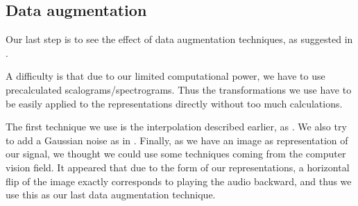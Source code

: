 \documentclass[final]{cvpr}
\begin{document}
\subsection{Data augmentation}
Our last step is to see the effect of data augmentation techniques, as suggested in \cite{squelette_progr}. 

A difficulty is that due to our limited computational power, we have to use precalculated scalograms/spectrograms. Thus the transformations we use have to be easily applied to the representations directly without too much calculations.

The first technique we use is the interpolation described earlier, as \cite{squelette_progr}. We also try to add a Gaussian noise as in \cite{data_aug}. Finally, as we have an image as representation of our signal, we thought we could use some techniques coming from the computer vision field. It appeared that due to the form of our representations, a horizontal flip of the image exactly corresponds to playing the audio backward, and thus we use this as our last data augmentation technique. 
\end{document}
